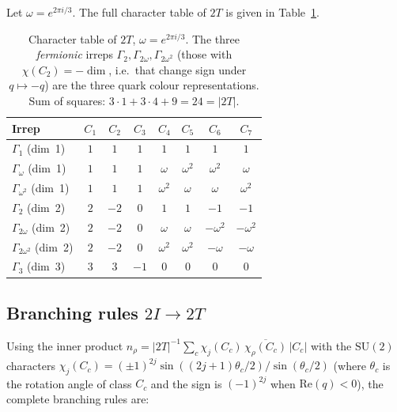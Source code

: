 \documentclass[11pt,a4paper]{article}
\theoremstyle{definition}\newtheorem{definition}[theorem]{Definition}
\theoremstyle{remark}
\newcommand{\twoT}{2T}
\begin{document}
Let $\omega=e^{2\pi i/3}$.
The full character table of $\twoT$ is given in Table~\ref{P15:tab:2T_chars}.

\begin{table}[h!]
\centering
\renewcommand{\arraystretch}{1.25}
\setlength{\tabcolsep}{6pt}
\begin{tabular}{lccccccc}
\toprule
Irrep & $C_1$ & $C_2$ & $C_3$ & $C_4$ & $C_5$ & $C_6$ & $C_7$ \\
\midrule
$\Gamma_1$ (dim~1) & $1$ & $1$ & $1$ & $1$ & $1$ & $1$ & $1$ \\
$\Gamma_\omega$ (dim~1) & $1$ & $1$ & $1$ & $\omega$ & $\omega^2$ & $\omega^2$ & $\omega$ \\
$\Gamma_{\omega^2}$ (dim~1) & $1$ & $1$ & $1$ & $\omega^2$ & $\omega$ & $\omega$ & $\omega^2$ \\
$\Gamma_2$ (dim~2) & $2$ & $-2$ & $0$ & $1$ & $1$ & $-1$ & $-1$ \\
$\Gamma_{2\omega}$ (dim~2) & $2$ & $-2$ & $0$ & $\omega$ & $\omega$ & $-\omega^2$ & $-\omega^2$ \\
$\Gamma_{2\omega^2}$ (dim~2) & $2$ & $-2$ & $0$ & $\omega^2$ & $\omega^2$ & $-\omega$ & $-\omega$ \\
$\Gamma_3$ (dim~3) & $3$ & $3$ & $-1$ & $0$ & $0$ & $0$ & $0$ \\
\bottomrule
\end{tabular}
\caption{Character table of $\twoT$, $\omega=e^{2\pi i/3}$.
The three \emph{fermionic} irreps $\Gamma_2,\Gamma_{2\omega},\Gamma_{2\omega^2}$
(those with $\chi(C_2)=-\dim$, i.e.\ that change sign under $q\mapsto -q$)
are the three quark colour representations.
Sum of squares: $3\cdot1+3\cdot4+9=24=|\twoT|$. \checkmark}
\label{P15:tab:2T_chars}
\end{table}

\subsection{Branching rules $2I\to 2T$}

Using the inner product $n_\rho = |\twoT|^{-1}\sum_c\chi_j(C_c)\,\overline{\chi_\rho(C_c)}\,|C_c|$
with the $\mathrm{SU}(2)$ characters
$\chi_j(C_c)=(\pm1)^{2j}\sin((2j+1)\theta_c/2)/\sin(\theta_c/2)$
(where $\theta_c$ is the rotation angle of class $C_c$ and the sign
is $(-1)^{2j}$ when $\mathrm{Re}(q)<0$),
the complete branching rules are:
\end{document}
